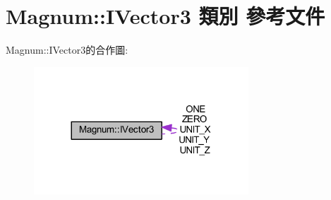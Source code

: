 \hypertarget{class_magnum_1_1_i_vector3}{}\section{Magnum\+:\+:I\+Vector3 類別 參考文件}
\label{class_magnum_1_1_i_vector3}


Magnum\+:\+:I\+Vector3的合作圖\+:\nopagebreak
\begin{figure}[H]
\begin{center}
\leavevmode
\includegraphics[width=228pt]{class_magnum_1_1_i_vector3__coll__graph}
\end{center}
\end{figure}

